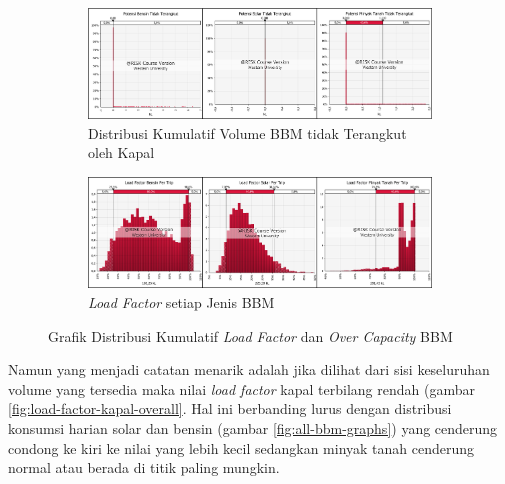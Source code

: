 \begin{figure}[htbp!]
    \centering
    \begin{minipage}{\textwidth}
        \centering
        \begin{subfigure}[b]{0.9\textwidth}
            \centering
            \includegraphics[width=\textwidth]{gambar/potensi-bbm-overcap.png}
            \caption{Distribusi Kumulatif Volume BBM tidak Terangkut oleh Kapal}
            \label{fig:potensi-bbm-overcap}
        \end{subfigure}
    \end{minipage}
    
    \vspace{1em} %
    
    \begin{minipage}{\textwidth}
        \centering
        \begin{subfigure}[b]{0.9\textwidth}
            \centering
            \includegraphics[width=\textwidth]{gambar/loadfactor-bbm-pertrip.png}
            \caption{\emph{Load Factor} setiap Jenis BBM}
            \label{fig:load-factor-bbm-pertrip}
        \end{subfigure}
    \end{minipage}
    \caption{Grafik Distribusi Kumulatif \emph{Load Factor} dan \emph{Over Capacity} BBM}
    \label{fig:grafik-analisis-overcap-BBM}
\end{figure}

Namun yang menjadi catatan menarik adalah jika dilihat dari sisi keseluruhan volume yang tersedia maka nilai \emph{load factor} kapal terbilang rendah (gambar \ref{fig:load-factor-kapal-overall}. Hal ini berbanding lurus dengan distribusi konsumsi harian solar dan bensin (gambar \ref{fig:all-bbm-graphs}) yang cenderung condong ke kiri ke nilai yang lebih kecil sedangkan minyak tanah cenderung normal atau berada di titik paling mungkin.

